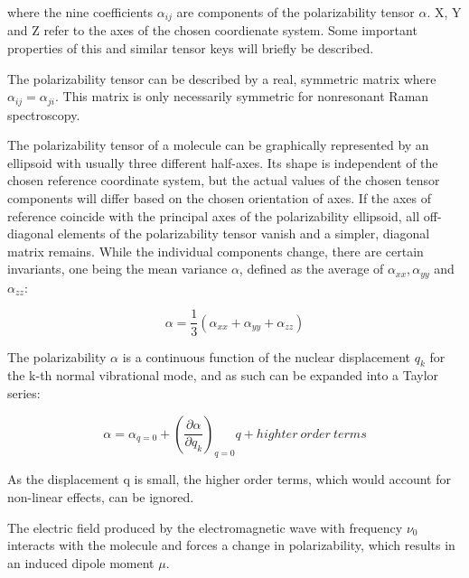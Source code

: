 where the nine coefficients \(\alpha_{ij} \) are components of the polarizability tensor \(\alpha\). X, Y and Z refer to the axes of the chosen coordienate system. Some important properties of this and similar tensor keys will briefly be described.

\bigskip

The polarizability tensor can be described by a real, symmetric matrix where \(\alpha_{ij} = \alpha_{ji}\). This matrix is only necessarily symmetric for nonresonant Raman spectroscopy. 

\bigskip

The polarizability tensor of a molecule can be graphically represented by an ellipsoid with usually three different half-axes. Its shape is independent of the chosen reference coordinate system, but the actual values of the chosen tensor components will differ based on the chosen orientation of axes. If the axes of reference coincide with the principal axes of the polarizability ellipsoid, all off-diagonal elements of the polarizability tensor vanish and a simpler,  diagonal matrix remains. While the individual components change, there are certain invariants, one being the mean variance \(\alpha\), defined as the average of \(\alpha_{xx}, \alpha_{yy} \) and \(\alpha_{zz}\):

\begin{equation}
    \alpha=\frac{1}{3}(\alpha_{xx}+\alpha_{yy}+\alpha_{zz})
\end{equation}

\bigskip


The polarizability \(\alpha\) is a continuous function of the nuclear displacement \(q_k\) for the k-th normal vibrational mode, and as such can be expanded into a Taylor series:

\begin{equation} \label{eq:polarizability}
    \alpha=\alpha_{q=0} + 
    \left( \frac{\partial\alpha}{\partial q_k}\right)_{q=0}q + highter\:order\:terms
\end{equation}



As the displacement q is small, the higher order terms, which would account for non-linear effects, can be ignored. 

\bigskip

The electric field produced by the electromagnetic wave with frequency \(\nu_0\) interacts with the molecule and forces a change in polarizability, which results in an induced dipole moment \(\mu\).

